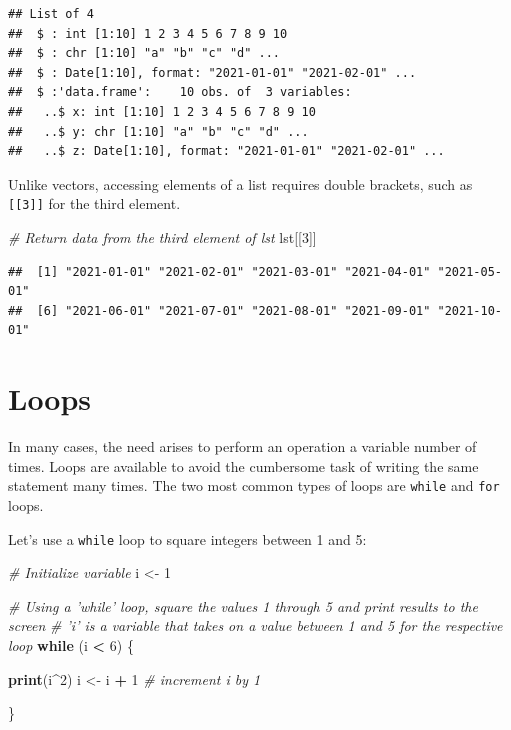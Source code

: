 \documentclass[]{book}
\newenvironment{Shaded}{\begin{snugshade}}{\end{snugshade}}
\newcommand{\CommentTok}[1]{\textcolor[rgb]{0.56,0.35,0.01}{\textit{#1}}}
\newcommand{\ControlFlowTok}[1]{\textcolor[rgb]{0.13,0.29,0.53}{\textbf{#1}}}
\newcommand{\DecValTok}[1]{\textcolor[rgb]{0.00,0.00,0.81}{#1}}
\newcommand{\KeywordTok}[1]{\textcolor[rgb]{0.13,0.29,0.53}{\textbf{#1}}}
\newcommand{\NormalTok}[1]{#1}
\newcommand{\OperatorTok}[1]{\textcolor[rgb]{0.81,0.36,0.00}{\textbf{#1}}}
\newcommand{\StringTok}[1]{\textcolor[rgb]{0.31,0.60,0.02}{#1}}
\begin{document}
\begin{verbatim}
## List of 4
##  $ : int [1:10] 1 2 3 4 5 6 7 8 9 10
##  $ : chr [1:10] "a" "b" "c" "d" ...
##  $ : Date[1:10], format: "2021-01-01" "2021-02-01" ...
##  $ :'data.frame':    10 obs. of  3 variables:
##   ..$ x: int [1:10] 1 2 3 4 5 6 7 8 9 10
##   ..$ y: chr [1:10] "a" "b" "c" "d" ...
##   ..$ z: Date[1:10], format: "2021-01-01" "2021-02-01" ...
\end{verbatim}

Unlike vectors, accessing elements of a list requires double brackets, such as \texttt{{[}{[}3{]}{]}} for the third element.

\begin{Shaded}
\begin{Highlighting}[]
\CommentTok{# Return data from the third element of lst}
\NormalTok{lst[[}\DecValTok{3}\NormalTok{]]}
\end{Highlighting}
\end{Shaded}

\begin{verbatim}
##  [1] "2021-01-01" "2021-02-01" "2021-03-01" "2021-04-01" "2021-05-01"
##  [6] "2021-06-01" "2021-07-01" "2021-08-01" "2021-09-01" "2021-10-01"
\end{verbatim}

\hypertarget{loops}{%
\section{Loops}\label{loops}}

In many cases, the need arises to perform an operation a variable number of times. Loops are available to avoid the cumbersome task of writing the same statement many times. The two most common types of loops are \texttt{while} and \texttt{for} loops.

Let's use a \texttt{while} loop to square integers between 1 and 5:

\begin{Shaded}
\begin{Highlighting}[]
\CommentTok{# Initialize variable}
\NormalTok{i <-}\StringTok{ }\DecValTok{1}

\CommentTok{# Using a 'while' loop, square the values 1 through 5 and print results to the screen}
\CommentTok{# 'i' is a variable that takes on a value between 1 and 5 for the respective loop}
\ControlFlowTok{while}\NormalTok{ (i }\OperatorTok{<}\StringTok{ }\DecValTok{6}\NormalTok{) \{}
  
  \KeywordTok{print}\NormalTok{(i}\OperatorTok{^}\DecValTok{2}\NormalTok{) }
\NormalTok{  i <-}\StringTok{ }\NormalTok{i }\OperatorTok{+}\StringTok{ }\DecValTok{1} \CommentTok{# increment i by 1}
  
\NormalTok{\}}
\end{Highlighting}
\end{Shaded}
\end{document}
